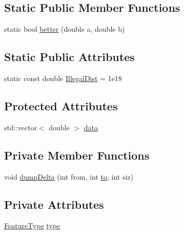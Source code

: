 \subsection*{Static Public Member Functions}
\begin{DoxyCompactItemize}
\item 
static bool \hyperlink{class_feature_aa0bc0278d8eab284993d53d300943730}{better} (double a, double b)
\end{DoxyCompactItemize}
\subsection*{Static Public Attributes}
\begin{DoxyCompactItemize}
\item 
static const double \hyperlink{class_feature_ac3083a52765fa23ddccc5a90058fc2d8}{Illegal\+Dist} = 1e18
\end{DoxyCompactItemize}
\subsection*{Protected Attributes}
\begin{DoxyCompactItemize}
\item 
std\+::vector$<$ double $>$ \hyperlink{class_feature_a6da19ed79bc614409027cf0cf61933a1}{data}
\end{DoxyCompactItemize}
\subsection*{Private Member Functions}
\begin{DoxyCompactItemize}
\item 
void \hyperlink{class_feature_a0750e4990eabfcfb38b2fd939de18b7b}{dump\+Delta} (int from, int \hyperlink{rastaplp_8m_a41c60bbfbe5db430f286f173be10a1e6}{to}, int siz)
\end{DoxyCompactItemize}
\subsection*{Private Attributes}
\begin{DoxyCompactItemize}
\item 
\hyperlink{class_feature_afa43293b1c8369e9ff47f6eedb7ad264}{Feature\+Type} \hyperlink{class_feature_a9325ce63b0c3062d70ad02a0e51e4ed3}{type}
\end{DoxyCompactItemize}


